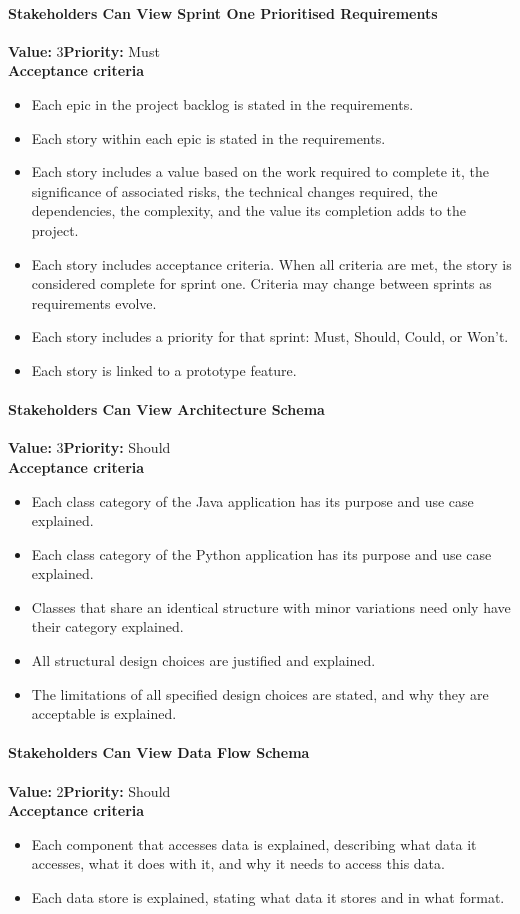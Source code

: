 \paragraph{Stakeholders Can View Sprint One Prioritised Requirements}
\textbf{Value:} 3\quad \textbf{Priority:} Must\\
\textbf{Acceptance criteria}
\begin{itemize}
  \item Each epic in the project backlog is stated in the requirements.
  \item Each story within each epic is stated in the requirements.
  \item Each story includes a value based on the work required to complete it, the significance of associated risks, the technical changes required, the dependencies, the complexity, and the value its completion adds to the project.
  \item Each story includes acceptance criteria. When all criteria are met, the story is considered complete for sprint one. Criteria may change between sprints as requirements evolve.
  \item Each story includes a priority for that sprint: Must, Should, Could, or Won't.
  \item Each story is linked to a prototype feature.
\end{itemize}

\paragraph{Stakeholders Can View Architecture Schema}
\textbf{Value:} 3\quad \textbf{Priority:} Should\\
\textbf{Acceptance criteria}
\begin{itemize}
  \item Each class category of the Java application has its purpose and use case explained.
  \item Each class category of the Python application has its purpose and use case explained.
  \item Classes that share an identical structure with minor variations need only have their category explained.
  \item All structural design choices are justified and explained.
  \item The limitations of all specified design choices are stated, and why they are acceptable is explained.
\end{itemize}

\paragraph{Stakeholders Can View Data Flow Schema}
\textbf{Value:} 2\quad \textbf{Priority:} Should\\
\textbf{Acceptance criteria}
\begin{itemize}
  \item Each component that accesses data is explained, describing what data it accesses, what it does with it, and why it needs to access this data.
  \item Each data store is explained, stating what data it stores and in what format.
\end{itemize}

